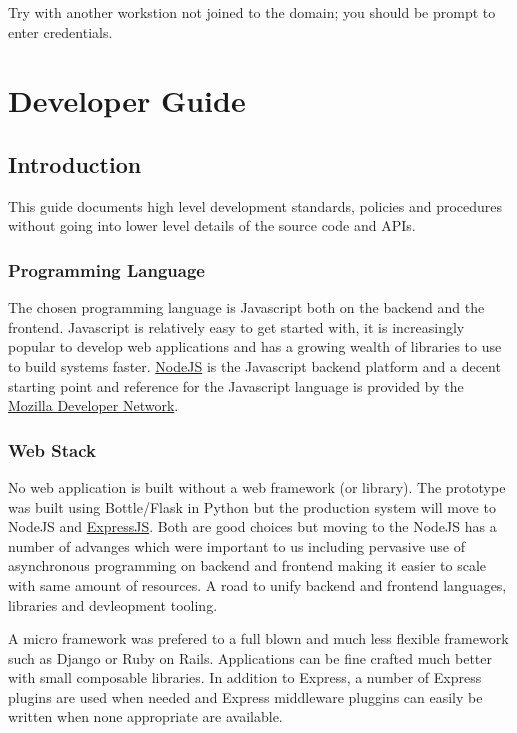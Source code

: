 \documentclass[letterpaper,10pt,english]{sphinxmanual}
\begin{document}
Try with another workstion not joined to the domain; you should be
prompt to enter credentials.


\chapter{Developer Guide}
\label{developer-guide::doc}\label{developer-guide:developer-guide}

\section{Introduction}
\label{developer-guide:introduction}\label{developer-guide:intro}
This guide documents high level development standards, policies and
procedures without going into lower level details of the source code
and APIs.


\subsection{Programming Language}
\label{developer-guide:prog-lang}\label{developer-guide:programming-language}
The chosen programming language is Javascript both on the backend and
the frontend. Javascript is relatively easy to get started with, it is
increasingly popular to develop web applications and has a growing
wealth of libraries to use to build systems faster. \href{http://www.nodejs.org/}{NodeJS} is the Javascript backend platform and a
decent starting point and reference for the Javascript language is
provided by the \href{https://developer.mozilla.org/en-US/docs/Web/JavaScript}{Mozilla Developer Network}.


\subsection{Web Stack}
\label{developer-guide:web-stack}
No web application is built without a web framework (or library). The
prototype was built using Bottle/Flask in Python but the production
system will move to NodeJS and \href{http://expressjs.com/}{ExpressJS}. Both are good choices but moving to the
NodeJS has a number of advanges which were important to us including
pervasive use of asynchronous programming on backend and frontend
making it easier to scale with same amount of resources. A road to
unify backend and frontend languages, libraries and devleopment
tooling.

A micro framework was prefered to a full blown and much less flexible
framework such as Django or Ruby on Rails. Applications can be fine
crafted much better with small composable libraries. In addition to
Express, a number of Express plugins are used when needed and
Express middleware pluggins can easily be written when none
appropriate are available.
\end{document}
